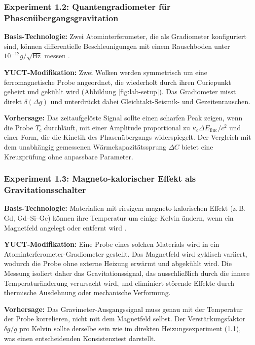 \documentclass[12pt]{article}
\theoremstyle{remark}
\begin{document}
	\subsubsection{Experiment 1.2: Quantengradiometer für Phasenübergangsgravitation}
	
	\textbf{Basis-Technologie:} Zwei Atominterferometer, die als Gradiometer konfiguriert sind, können differentielle Beschleunigungen mit einem Rauschboden unter \(10^{-12}g/\sqrt{\mathrm{Hz}}\) messen \cite{Snadden1998}.
	
	\textbf{YUCT-Modifikation:} Zwei Wolken werden symmetrisch um eine ferromagnetische Probe angeordnet, die wiederholt durch ihren Curiepunkt geheizt und gekühlt wird (Abbildung \ref{fig:lab-setup}). Das Gradiometer misst direkt \(\delta(\Delta g)\) und unterdrückt dabei Gleichtakt-Seismik- und Gezeitenrauschen.
	
	\textbf{Vorhersage:} Das zeitaufgelöste Signal sollte einen scharfen Peak zeigen, wenn die Probe \(T_c\) durchläuft, mit einer Amplitude proportional zu \(\kappa_c \Delta E_{\mathrm{fluc}}/c^2\) und einer Form, die die Kinetik des Phasenübergangs widerspiegelt. Der Vergleich mit dem unabhängig gemessenen Wärmekapazitätssprung \(\Delta C\) bietet eine Kreuzprüfung ohne anpassbare Parameter.
	
	\subsubsection{Experiment 1.3: Magneto-kalorischer Effekt als Gravitationsschalter}
	
	\textbf{Basis-Technologie:} Materialien mit riesigem magneto-kalorischen Effekt (z. B. Gd, Gd–Si–Ge) können ihre Temperatur um einige Kelvin ändern, wenn ein Magnetfeld angelegt oder entfernt wird \cite{Gschneidner1999}.
	
	\textbf{YUCT-Modifikation:} Eine Probe eines solchen Materials wird in ein Atominterferometer-Gradiometer gestellt. Das Magnetfeld wird zyklisch variiert, wodurch die Probe ohne externe Heizung erwärmt und abgekühlt wird. Die Messung isoliert daher das Gravitationssignal, das ausschließlich durch die innere Temperaturänderung verursacht wird, und eliminiert störende Effekte durch thermische Ausdehnung oder mechanische Verformung.
	
	\textbf{Vorhersage:} Das Gravimeter-Ausgangssignal muss genau mit der Temperatur der Probe korrelieren, nicht mit dem Magnetfeld selbst. Der Verstärkungsfaktor \(\delta g/g\) pro Kelvin sollte derselbe sein wie im direkten Heizungsexperiment (1.1), was einen entscheidenden Konsistenztest darstellt.
	
\end{document}
